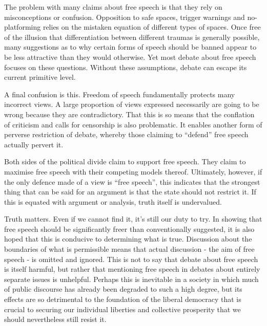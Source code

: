 \documentclass[10pt,a4paper,twoside]{article}
\begin{document}
\begin{multicols}{2}
The problem with many claims about free speech is that they rely on
misconceptions or confusion. Opposition to safe spaces, trigger warnings
and no-platforming relies on the mistaken equation of different types of
spaces. Once free of the illusion that differentiation between different
traumas is generally possible, many suggestions as to why certain forms
of speech should be banned appear to be less attractive than they would
otherwise. Yet most debate about free speech focuses on these questions.
Without these assumptions, debate can escape its current primitive
level.

A final confusion is this. Freedom of speech fundamentally protects many
incorrect views. A large proportion of views expressed necessarily are
going to be wrong because they are contradictory. That this is so means
that the conflation of criticism and calls for censorship is also
problematic. It enables another form of perverse restriction of debate,
whereby those claiming to ``defend'' free speech actually pervert it.

Both sides of the political divide claim to support free speech. They
claim to maximise free speech with their competing models thereof.
Ultimately, however, if the only defence made of a view is ``free
speech'', this indicates that the strongest thing that can be said for
an argument is that the state should not restrict it. If this is equated
with argument or analysis, truth itself is undervalued.

Truth matters. Even if we cannot find it, it's still our duty to try. In
showing that free speech should be significantly freer than
conventionally suggested, it is also hoped that this is conducive to
determining what is true. Discussion about the boundaries of what is
permissible means that actual discussion - the aim of free speech - is
omitted and ignored. This is not to say that debate about free speech is
itself harmful, but rather that mentioning free speech in debates about
entirely separate issues is unhelpful. Perhaps this is inevitable in a
society in which much of public discourse has already been degraded to
such a high degree, but its effects are so detrimental to the foundation
of the liberal democracy that is crucial to securing our individual
liberties and collective prosperity that we should nevertheless still
resist it.

\end{multicols}
\end{document}
